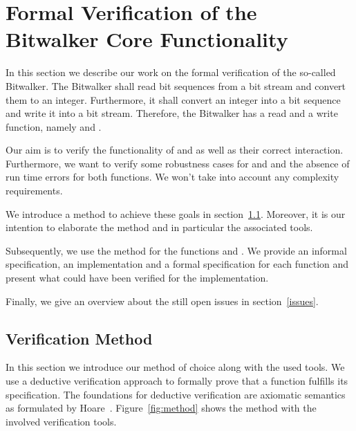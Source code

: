 
\section{Formal Verification of the Bitwalker Core Functionality}
\label{sec:formal-verification}


In this section we describe our work on the formal verification
of the so-called Bitwalker.
The Bitwalker shall read bit sequences from a bit stream 
and convert them to an integer. Furthermore, it shall
convert an integer into a bit sequence and write it into a bit stream.
Therefore, the Bitwalker has a read and a write function, namely \peek and \poke.

Our aim is to verify the functionality of
\peek and \poke
as well as their correct interaction.
Furthermore, we want to verify some robustness cases for \peek and \poke
and the absence of run time errors for both functions.
We won't take into account any complexity requirements.

We introduce a method to achieve these goals in section~\ref{plan}.
Moreover, it is our intention
to elaborate the method and in particular the associated tools.

Subsequently, we use the method for the functions \peek and \poke.
We provide an informal specification, an implementation and
a formal specification for each function and
present what could have been verified for the implementation.

Finally, we give an overview about the still open issues in section~\ref{issues}.


\clearpage

\subsection{Verification Method}
\label{plan}
\label{method}


In this section we introduce our method of choice along with the used tools.
We use a deductive verification approach to 
formally prove that a function fulfills its specification.
The foundations for deductive verification are axiomatic semantics as formulated
by Hoare~\cite{HoareCalculus}.
Figure~\ref{fig:method} shows the method with the involved verification tools.

